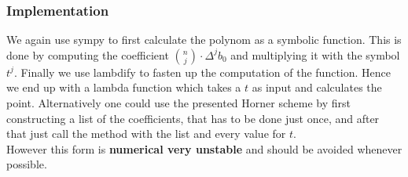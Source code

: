 \subsubsection{Implementation}
We again use sympy to first calculate the polynom as a symbolic function. This is done by computing the coefficient $\binom{n}{j} \cdot \Delta^j b_0$ and multiplying it with the symbol $t^j$. Finally we use lambdify to fasten up the computation of the function. Hence we end up with a lambda function which takes a $t$ as input and calculates the point. Alternatively one could use the presented Horner scheme by first constructing a list of the coefficients, that has to be done just once, and after that just call the method with the list and every value for $t$.\\

However this form is \textbf{numerical very unstable} and should be avoided whenever possible.

